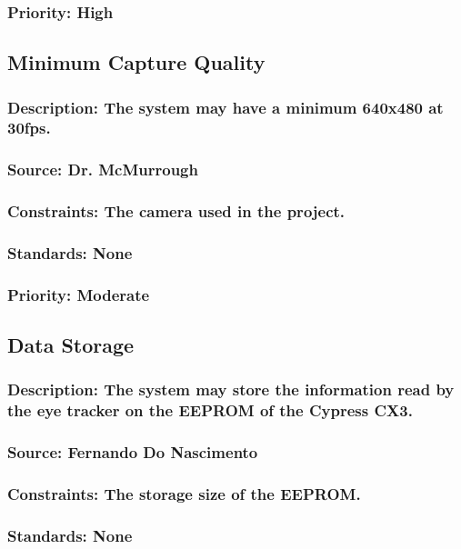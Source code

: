 \subsubsection{Priority: High}

\subsection{Minimum Capture Quality}
\subsubsection{Description: The system may have a minimum 640x480 at 30fps.}
\subsubsection{Source: Dr. McMurrough}
\subsubsection{Constraints: The camera used in the project.}
\subsubsection{Standards: None}
\subsubsection{Priority: Moderate}

\subsection{Data Storage}
\subsubsection{Description: The system may store the information read by the eye tracker on the EEPROM of the Cypress CX3.}
\subsubsection{Source: Fernando Do Nascimento}
\subsubsection{Constraints: The storage size of the EEPROM.}
\subsubsection{Standards: None}
